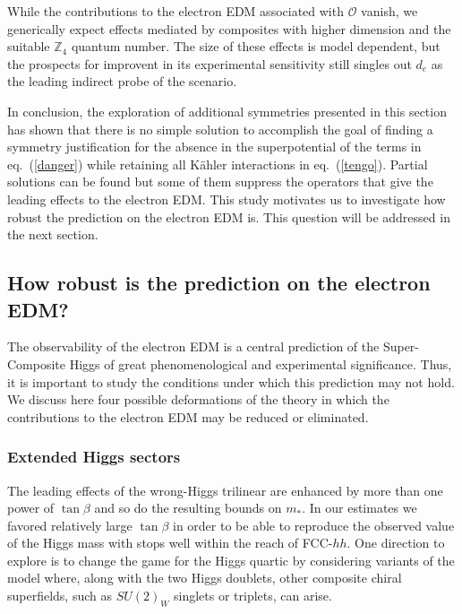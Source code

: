\documentclass[a4paper,12pt]{article}
\def\eq#1{eq.~(\ref{#1})}
\def\eq#1{eq.~(\ref{#1})}
\def\O{\mathcal{O}}
\begin{document}
{{{{While  the  contributions to the electron EDM associated with $\O$ vanish, we generically  expect   effects  mediated by composites with higher dimension and the suitable ${\mathbb Z}_4$ quantum number. The size of these effects is model dependent, but the prospects for improvent in its  experimental sensitivity still singles out $d_e$ as the leading indirect probe of the scenario.

\bigskip

In conclusion, the exploration of additional symmetries presented in this section has shown that there is no simple solution to accomplish the goal of finding a symmetry justification for the absence in the superpotential of the terms in \eq{danger} while retaining all K\"ahler interactions in \eq{tengo}. Partial solutions can be found but some of them suppress the operators that give the leading effects to the electron EDM. This study motivates us to investigate how robust the prediction on the electron EDM is. This question will be addressed in the next section.

\subsection{How robust is the prediction on the electron EDM?}
\label{sec:robust}
 
The observability of the electron EDM is a central prediction of the Super-Composite Higgs of great phenomenological and experimental significance. Thus, it is important to study the conditions under which this prediction may not hold. We discuss here four possible deformations of the theory in which the contributions to the electron EDM may be reduced or eliminated.

\subsubsection*{Extended Higgs sectors}

The leading effects of the wrong-Higgs trilinear are enhanced by more than one power of $\tan\beta$ and so do the resulting bounds on $m_*$. 
In our estimates we favored relatively large $\tan\beta$ in order to be able to reproduce the observed value of the Higgs mass with stops well within the reach of FCC-$hh$. One direction to explore is to change the game for the Higgs quartic by considering variants of the model where, along with the two Higgs doublets, other composite chiral superfields, such as $SU(2)_W$ singlets or triplets, can arise.

}}}}
\end{document}
